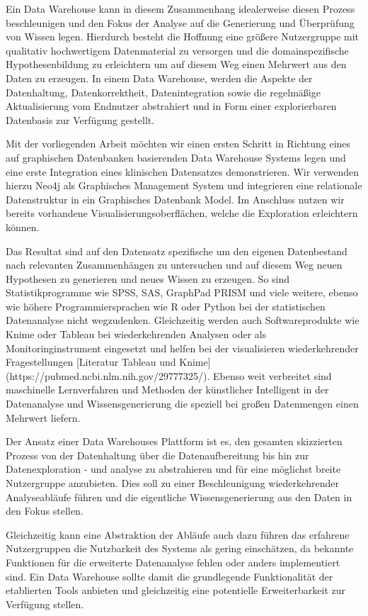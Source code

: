 Ein Data Warehouse kann in diesem Zusammenhang idealerweise diesen Prozess beschleunigen und den Fokus der Analyse auf die Generierung und Überprüfung von Wissen legen. Hierdurch besteht die Hoffnung eine größere Nutzergruppe mit qualitativ hochwertigem Datenmaterial zu versorgen und die domainspezifische Hypothesenbildung zu erleichtern um auf diesem Weg einen Mehrwert aus den Daten zu erzeugen. In einem Data Warehouse, werden die Aspekte der Datenhaltung, Datenkorrektheit, Datenintegration sowie die regelmäßige Aktualisierung vom Endnutzer abstrahiert und in Form einer explorierbaren Datenbasis zur Verfügung gestellt. 


Mit der vorliegenden Arbeit möchten wir einen ersten Schritt in Richtung eines auf graphischen Datenbanken basierenden Data Warehouse Systems legen und eine erste Integration eines klinischen Datensatzes demonstrieren. Wir verwenden hierzu Neo4j als Graphisches Management System und integrieren eine relationale Datenstruktur in ein Graphisches Datenbank Model. Im Anschluss nutzen wir bereits vorhandene Visualisierungsoberflächen, welche die Exploration erleichtern können.


Das Resultat sind auf den Datensatz spezifische  um den eigenen Datenbestand nach relevanten Zusammenhängen zu untersuchen und auf diesem Weg neuen Hypothesen zu generieren und neues Wissen zu erzeugen. 
So sind Statistikprogramme wie SPSS, SAS, GraphPad PRISM und viele weitere, ebenso wie höhere Programmiersprachen wie R oder Python bei der statistischen Datenanalyse nicht wegzudenken. Gleichzeitig werden auch Softwareprodukte wie Knime oder Tableau bei wiederkehrenden Analysen oder als Monitoringinstrument eingesetzt und helfen bei der visualisieren wiederkehrender Fragestellungen [Literatur Tableau und Knime](https://pubmed.ncbi.nlm.nih.gov/29777325/). Ebenso weit verbreitet sind maschinelle Lernverfahren und Methoden der künstlicher Intelligent in der Datenanalyse und Wissensgenerierung die speziell bei großen Datenmengen einen Mehrwert liefern. 

Der Ansatz einer Data Warehouses Plattform ist es, den gesamten skizzierten Prozess von der Datenhaltung über die Datenaufbereitung bis hin zur Datenexploration - und analyse zu abstrahieren und für eine möglichst breite Nutzergruppe anzubieten. Dies soll zu einer Beschleunigung wiederkehrender Analyseabläufe führen und die eigentliche Wissensgenerierung aus den Daten in den Fokus stellen. 

Gleichzeitig kann eine Abstraktion der Abläufe auch dazu führen das erfahrene Nutzergruppen die Nutzbarkeit des Systems als gering einschätzen, da bekannte Funktionen für die erweiterte Datenanalyse fehlen oder anders implementiert sind. 
Ein Data Warehouse sollte damit die grundlegende Funktionalität der etablierten Tools anbieten und gleichzeitig eine potentielle Erweiterbarkeit zur Verfügung stellen.

